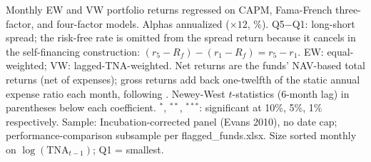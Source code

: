 \begin{table}[!htbp]
\begin{minipage}{\tabletempwidth}
\begin{singlespace}
Monthly EW and VW portfolio returns regressed on CAPM, Fama-French three-factor, and \textcite{Carhart1997} four-factor models. Alphas annualized ($\times 12$, \%). Q5$-$Q1: long-short spread; the risk-free rate is omitted from the spread return because it cancels in the self-financing construction: $(r_5 - R_f) - (r_1 - R_f) = r_5 - r_1$. EW: equal-weighted; VW: lagged-TNA-weighted. Net returns are the funds' NAV-based total returns (net of expenses); gross returns add back one-twelfth of the static annual expense ratio each month, following \textcite{FamaFrench2010}. Newey-West $t$-statistics (6-month lag) in parentheses below each coefficient. $^{*}$, $^{**}$, $^{***}$: significant at 10\%, 5\%, 1\% respectively. Sample: Incubation-corrected panel (Evans 2010), no date cap; performance-comparison subsample per flagged\_funds.xlsx. Size sorted monthly on $\log(\text{TNA}_{t-1})$; Q1 = smallest.
\end{singlespace}
\end{minipage}
\end{table}

